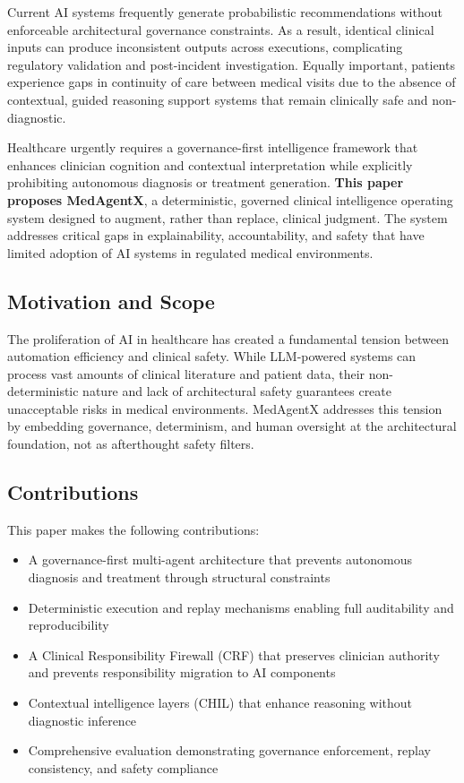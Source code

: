 \documentclass[conference]{IEEEtran}
\begin{document}
Current AI systems frequently generate probabilistic recommendations without enforceable architectural governance constraints. As a result, identical clinical inputs can produce inconsistent outputs across executions, complicating regulatory validation and post-incident investigation. Equally important, patients experience gaps in continuity of care between medical visits due to the absence of contextual, guided reasoning support systems that remain clinically safe and non-diagnostic.

Healthcare urgently requires a governance-first intelligence framework that enhances clinician cognition and contextual interpretation while explicitly prohibiting autonomous diagnosis or treatment generation. \textbf{This paper proposes MedAgentX}, a deterministic, governed clinical intelligence operating system designed to augment, rather than replace, clinical judgment. The system addresses critical gaps in explainability, accountability, and safety that have limited adoption of AI systems in regulated medical environments.

\subsection{Motivation and Scope}
The proliferation of AI in healthcare has created a fundamental tension between automation efficiency and clinical safety. While LLM-powered systems can process vast amounts of clinical literature and patient data, their non-deterministic nature and lack of architectural safety guarantees create unacceptable risks in medical environments. MedAgentX addresses this tension by embedding governance, determinism, and human oversight at the architectural foundation, not as afterthought safety filters.

\subsection{Contributions}
This paper makes the following contributions:
\begin{itemize}
    \item A governance-first multi-agent architecture that prevents autonomous diagnosis and treatment through structural constraints
    \item Deterministic execution and replay mechanisms enabling full auditability and reproducibility
    \item A Clinical Responsibility Firewall (CRF) that preserves clinician authority and prevents responsibility migration to AI components
    \item Contextual intelligence layers (CHIL) that enhance reasoning without diagnostic inference
    \item Comprehensive evaluation demonstrating governance enforcement, replay consistency, and safety compliance
\end{itemize}
\end{document}
